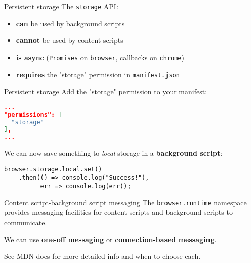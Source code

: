 \documentclass[../index.tex]{subfiles}
\begin{document}
\renewcommand{\currenttitle}{Persistent storage}
\begin{frame}[fragile]{\currenttitle}
  The \texttt{storage} API\footnotemark{}:

  \begin{itemize}
    \item \textbf{can} be used by background scripts
    \item \textbf{cannot} be used by content scripts
    \item \textbf{is async} (\texttt{Promises} on \texttt{browser}, callbacks on \texttt{chrome})
    \item \textbf{requires} the "storage" permission in \texttt{manifest.json}
  \end{itemize}

\end{frame}

\begin{frame}[fragile]{\currenttitle}
  Add the "storage" permission to your manifest:
  \begin{lstlisting}[language=json]
...
"permissions": [
  "storage"
],
...
  \end{lstlisting}

  We can now save something to \textit{local} storage in a \textbf{background
  script}:

  \begin{lstlisting}[language=ES6]
browser.storage.local.set()
    .then(() => console.log("Success!"), 
          err => console.log(err));
  \end{lstlisting}
\end{frame}

\renewcommand{\currenttitle}{Content script-background script messaging}
\begin{frame}[fragile]{\currenttitle}
  The \texttt{browser.runtime} namespace\footnotemark{} provides messaging facilities for
  content scripts and background scripts to communicate. \\[1.5em]


  We can use \textbf{one-off messaging} or \textbf{connection-based messaging}.

  See MDN docs\footnotemark{} for more detailed info and when to choose each.

\end{frame}
\end{document}
